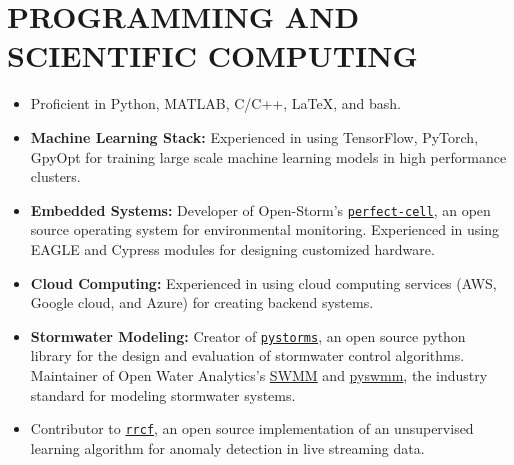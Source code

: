 \documentclass{my_cv}
\begin{document}
\section*{PROGRAMMING AND SCIENTIFIC COMPUTING}
\begin{itemize}
	\item Proficient in Python, MATLAB, C/C++, \LaTeX, and bash.
	\item \textbf{Machine Learning Stack:} Experienced in using TensorFlow, PyTorch, GpyOpt for training large scale machine learning models in high performance clusters. 
	\item \textbf{Embedded Systems:} Developer of Open-Storm's \href{https://github.com/open-storm/perfect-cell}{\texttt{perfect-cell}}, an open source operating system for environmental monitoring. Experienced in using EAGLE and Cypress modules for designing customized hardware.  
	\item \textbf{Cloud Computing:} Experienced in using cloud computing services (AWS, Google cloud, and Azure) for creating backend systems. 
	\item \textbf{Stormwater Modeling:} Creator of \href{https://klabum.github.io/pystorms/}{\texttt{pystorms}}, an open source python library for the design and evaluation of stormwater control algorithms. Maintainer of Open Water Analytics's \href{https://github.com/OpenWaterAnalytics/Stormwater-Management-Model}{SWMM} and \href{https://github.com/OpenWaterAnalytics/pyswmm}{pyswmm}, the industry standard for modeling stormwater systems. 
	\item Contributor to \href{https://github.com/kLabUM/rrcf}{\texttt{rrcf}}, an open source implementation of an unsupervised learning algorithm for anomaly detection in live streaming data. 
\end{itemize}
\end{document}
